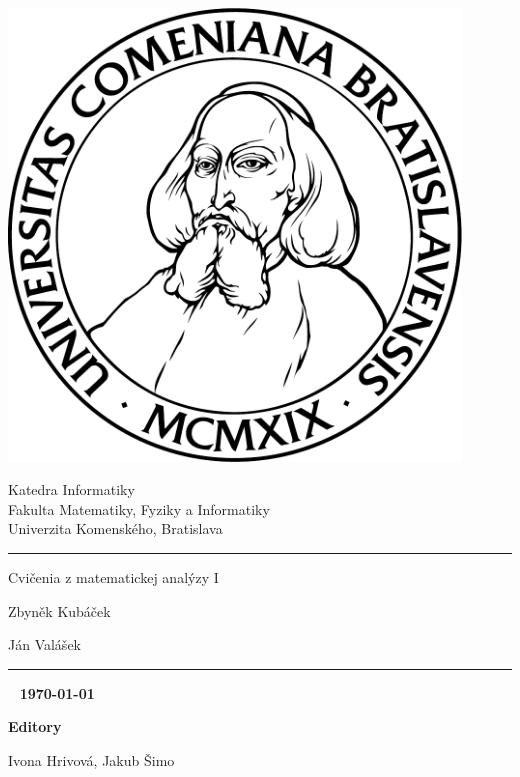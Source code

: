 \thispagestyle{empty}
\begin{minipage}{0.25\textwidth}
  \includegraphics[width=0.9\textwidth]{img/komlogo-new}
\end{minipage}
\begin{minipage}{0.69\textwidth}
  \begin{center}
    \sc Katedra Informatiky \\
    Fakulta Matematiky, Fyziky a Informatiky \\
    Univerzita Komenského, Bratislava
  \end{center}
\end{minipage}
\vfill
\begin{center}
  \begin{minipage}{0.8\textwidth}
    \hrule
    \bigskip\bigskip
    \centerline{\LARGE\sc Cvičenia z matematickej analýzy I}
    \bigskip\bigskip
    \centerline{\large\sc Zbyněk Kubáček}
    \bigskip
    \centerline{\large\sc Ján Valášek}
    \bigskip\bigskip
    \hrule
  \end{minipage}
\end{center}
\vfill
{~}
\hfill {\bf\today}

\hfill \textbf{Editory}

\hfill Ivona Hrivová, Jakub Šimo
\eject %
